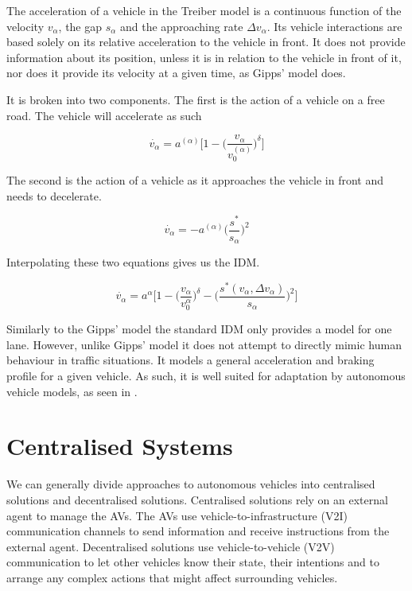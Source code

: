 The acceleration of a vehicle in the Treiber model is a continuous function of the velocity $v_\alpha$, the gap $s_\alpha$ and the approaching rate $\Delta v_\alpha$. Its vehicle interactions are based solely on its relative acceleration to the vehicle in front. It does not provide information about its position, unless it is in relation to the vehicle in front of it, nor does it provide its velocity at a given time, as Gipps' model does. 

It is broken into two components. The first is the action of a vehicle on a free road. The vehicle will accelerate as such

\begin{equation*}
\dot{v_\alpha} = a^{(\alpha)}\Biggl[1 - \biggl(\frac{v_\alpha}{v_0^(\alpha)}\biggr)^\delta\Biggr]
\end{equation*}

The second is the action of a vehicle as it approaches the vehicle in front and needs to decelerate. 

\begin{equation*}
\dot{v_\alpha} = - a^{(\alpha)}\biggl(\frac{s^*}{s_\alpha}\biggr)^2
\end{equation*}

Interpolating these two equations gives us the IDM. 

\begin{equation*}
\dot{v_\alpha} = a^{\alpha}\Biggl[1 - \biggl(\frac{v_\alpha}{v_0^\alpha}\biggr)^\delta - \biggl(\frac{s^*(v_\alpha,\Delta v_\alpha)}{s_\alpha}\biggr)^2\Biggr]
\end{equation*}

Similarly to the Gipps' model the standard IDM only provides a model for one lane. However, unlike Gipps' model it does not attempt to directly mimic human behaviour in traffic situations. It models a general acceleration and braking profile for a given vehicle. As such, it is well suited for adaptation by autonomous vehicle models, as seen in \citep{Kesting2007}.


\section{Centralised Systems}
\label{sec:Centralised Systems}
We can generally divide approaches to autonomous vehicles into centralised solutions and decentralised solutions. Centralised solutions rely on an external agent to manage the AVs. The AVs use vehicle-to-infrastructure (V2I) communication channels to send information and receive instructions from the external agent. Decentralised solutions use vehicle-to-vehicle (V2V) communication to let other vehicles know their state, their intentions and to arrange any complex actions that might affect surrounding vehicles.


